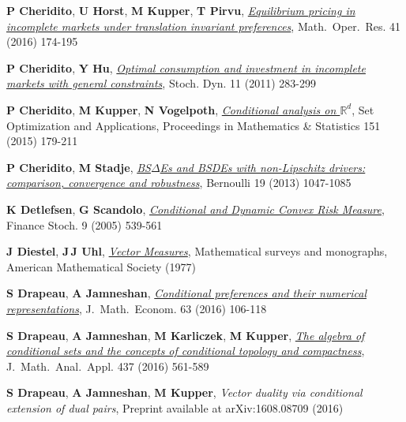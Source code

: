 \documentclass{jloganal}
\numberwithin{equation}{section}
\theoremstyle{plain}
\begin{document}
\begin{thebibliography}{}
\textbf{P Cheridito}, \textbf{U Horst}, \textbf{M Kupper}, \textbf{T Pirvu}, \href{http://dx.doi.org/10.1287/moor.2015.0721} {\emph{{Equilibrium pricing in incomplete markets under translation invariant preferences}}},
  Math.~Oper.~Res. 41 (2016) 174-195
  
\textbf{P Cheridito}, \textbf{Y Hu},
  \href{http://dx.doi.org/10.1142/S0219493711003280} {\emph{{Optimal
  consumption and investment in incomplete markets with general constraints}}}, Stoch. Dyn. 11 (2011) 283-299

\textbf{P Cheridito}, \textbf{M Kupper}, \textbf{N Vogelpoth},
  \href{http://dx.doi.org/10.1007/978-3-662-48670-2$_6$} {\emph{{Conditional
  analysis on $\mathbb{R}^d$}}}, Set Optimization and Applications, Proceedings in Mathematics \& Statistics 151 (2015) 179-211

\textbf{P Cheridito}, \textbf{M Stadje},
  \href{http://dx.doi.org/10.3150/12-BEJ445} {\emph{{BS$\Delta$Es and BSDEs
  with non-Lipschitz drivers: comparison, convergence and robustness}}},
  Bernoulli 19 (2013) 1047-1085

\textbf{K Detlefsen}, \textbf{G Scandolo},
  \href{http://dx.doi.org/10.1007/s00780-005-0159-6} {\emph{{Conditional and
  Dynamic Convex Risk Measure}}}, Finance Stoch. 9 (2005) 539-561

\textbf{J Diestel}, \textbf{J\,J Uhl},
  \href{http://dx.doi.org/10.1090/surv/015} {\emph{Vector Measures}},
  Mathematical surveys and monographs, American Mathematical Society (1977)

\textbf{S Drapeau}, \textbf{A Jamneshan},
  \href{http://dx.doi.org/10.1016/j.jmateco.2015.12.004} {\emph{{Conditional
  preferences and their numerical representations}}}, J.~Math.~Econom. 63
  (2016) 106-118

\textbf{S Drapeau}, \textbf{A Jamneshan}, \textbf{M Karliczek}, \textbf{M
  Kupper}, \href{http://dx.doi.org/10.1016/j.jmaa.2015.11.057} {\emph{{The
  algebra of conditional sets and the concepts of conditional topology and
  compactness}}}, J.~Math.~Anal.~Appl. 437 (2016) 561-589

\textbf{S Drapeau}, \textbf{A Jamneshan}, \textbf{M Kupper}, \emph{{Vector
  duality via conditional extension of dual pairs}}, Preprint available at
  arXiv:1608.08709  (2016)


\end{thebibliography}
\end{document}
